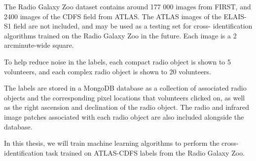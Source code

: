     The Radio Galaxy Zoo dataset contains around 177 000 images from FIRST, and
    2400 images of the CDFS field from ATLAS. The ATLAS images of the ELAIS-S1
    field are not included, and may be used as a testing set for cross-%
    identification algorithms trained on the Radio Galaxy Zoo in the future.
    Each image is a 2 arcminute-wide square.

    To help reduce noise in the labels, each compact radio object is shown to 5
    volunteers, and each complex radio object is shown to 20 volunteers.

    The labels are stored in a MongoDB database as a collection of associated
    radio objects and the corresponding pixel locations that volunteers clicked
    on, as well as the right ascension and declination of the radio object. The
    radio and infrared image patches associated with each radio object are also
    included alongside the database.

    In this thesis, we will train machine learning algorithms to perform the
    cross-identification task trained on ATLAS-CDFS labels from the Radio Galaxy
    Zoo.



